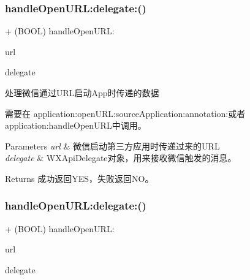 \subsubsection{\texorpdfstring{handle\+Open\+U\+R\+L\+:delegate\+:()}{handleOpenURL:delegate:()}\hspace{0.1cm}{\footnotesize\ttfamily [1/3]}}
{\footnotesize\ttfamily + (B\+O\+OL) handle\+Open\+U\+R\+L\+: \begin{DoxyParamCaption}\item[{(N\+S\+U\+RL $\ast$)}]{url }\item[{delegate:(id$<$ W\+X\+Api\+Delegate $>$)}]{delegate }\end{DoxyParamCaption}}



处理微信通过\+U\+R\+L启动\+App时传递的数据 

需要在 application\+:open\+U\+R\+L\+:source\+Application\+:annotation\+:或者application\+:handle\+Open\+U\+R\+L中调用。 
\begin{DoxyParams}{Parameters}
{\em url} & 微信启动第三方应用时传递过来的\+U\+RL \\
\hline
{\em delegate} & W\+X\+Api\+Delegate对象，用来接收微信触发的消息。 \\
\hline
\end{DoxyParams}
\begin{DoxyReturn}{Returns}
成功返回\+Y\+E\+S，失败返回\+N\+O。 
\end{DoxyReturn}
\mbox{\label{interface_w_x_api_aab36d7c09414d7bc3d7ca200b48f2f9c}} 
\subsubsection{\texorpdfstring{handle\+Open\+U\+R\+L\+:delegate\+:()}{handleOpenURL:delegate:()}\hspace{0.1cm}{\footnotesize\ttfamily [2/3]}}
{\footnotesize\ttfamily + (B\+O\+OL) handle\+Open\+U\+R\+L\+: \begin{DoxyParamCaption}\item[{(N\+S\+U\+RL $\ast$)}]{url }\item[{delegate:(id$<$ W\+X\+Api\+Delegate $>$)}]{delegate }\end{DoxyParamCaption}}



